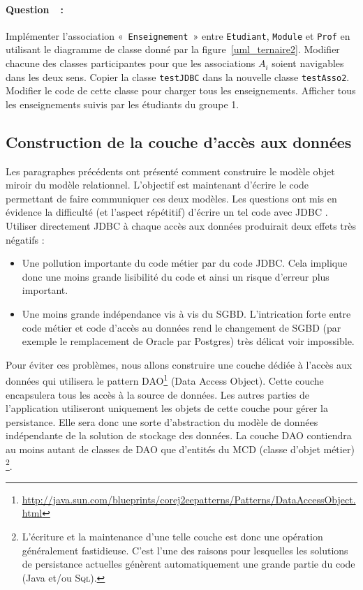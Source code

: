 \documentclass[a4paper,11pt]{article}
\newcounter{compteurQuestion}
\newcommand{\Question}{\paragraph*{Question~\thecompteurQuestion~:}\addtocounter{compteurQuestion}{1}}
\begin{document}
\Question Implémenter l'association «~\texttt{Enseignement}~» entre \texttt{Etudiant}, \texttt{Module} et \texttt{Prof} 
en utilisant le diagramme de classe donné par la figure~\ref{uml_ternaire2}. 
Modifier chacune des classes participantes pour que les associations $A_i$ soient navigables dans les deux sens. 
Copier la classe \texttt{testJDBC} dans la nouvelle classe \texttt{testAsso2}.
Modifier le code de cette classe pour charger tous les enseignements. 
Afficher tous les enseignements suivis par les étudiants du groupe 1.

\subsection{Construction de la couche d'accès aux données}
Les paragraphes précédents ont présenté comment construire le modèle objet miroir du modèle relationnel.
L'objectif est maintenant d'écrire le code permettant de faire communiquer ces deux modèles.
Les questions ont mis en évidence la difficulté (et l'aspect répétitif) d'écrire un tel code avec JDBC . 
Utiliser directement JDBC à chaque accès aux données produirait deux effets très négatifs : 
\begin{itemize}
 	\item Une pollution importante du code métier par du code JDBC. Cela implique donc une moins 
 	grande lisibilité du code et ainsi un risque d'erreur plus important.
 	\item Une moins grande indépendance vis à vis du SGBD. L'intrication forte entre code métier et 
 	code d'accès au données rend le changement de SGBD (par exemple le remplacement de Oracle par Postgres) 
 	très délicat voir impossible.
\end{itemize} 
Pour éviter ces problèmes, nous allons construire une couche dédiée à l'accès aux données 
qui utilisera le pattern DAO\footnote{\url{http://java.sun.com/blueprints/corej2eepatterns/Patterns/DataAccessObject.html}} (Data Access Object).
Cette couche encapsulera tous les accès à la source de données. Les autres parties de l'application 
utiliseront uniquement les objets de cette couche pour gérer la persistance. Elle 
sera donc une sorte d'abstraction du modèle de données indépendante de la solution de stockage 
des données. La couche DAO contiendra au moins autant de classes de DAO que d'entités du MCD (classe d'objet métier) 
\footnote{L'écriture et la maintenance d'une telle couche est donc une opération généralement fastidieuse. 
C'est l'une des raisons pour lesquelles les solutions de persistance actuelles génèrent 
automatiquement une grande partie du code (Java et/ou \textsc{Sql}).}.
\end{document}
